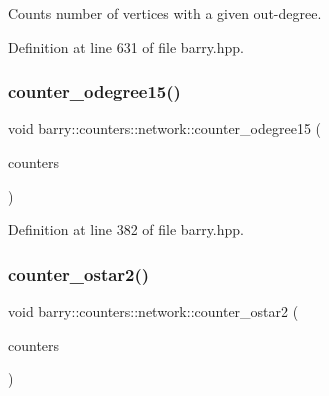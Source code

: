Counts number of vertices with a given out-\/degree. 



Definition at line 631 of file barry.\+hpp.

\mbox{\label{namespacebarry_1_1counters_1_1network_a7a43854f3227f5f92d3ff580e99c7136}} 
\subsubsection{\texorpdfstring{counter\+\_\+odegree15()}{counter\_odegree15()}}
{\footnotesize\ttfamily void barry\+::counters\+::network\+::counter\+\_\+odegree15 (\begin{DoxyParamCaption}\item[{\hyperlink{namespacebarry_1_1counters_1_1network_a3b3c590303d47840d1967372ae495d95}{Net\+Counter\+Vector} $\ast$}]{counters }\end{DoxyParamCaption})\hspace{0.3cm}{\ttfamily [inline]}}



Definition at line 382 of file barry.\+hpp.

\mbox{\label{namespacebarry_1_1counters_1_1network_af76d9df31e55422bdffdb9e56870a46f}} 
\subsubsection{\texorpdfstring{counter\+\_\+ostar2()}{counter\_ostar2()}}
{\footnotesize\ttfamily void barry\+::counters\+::network\+::counter\+\_\+ostar2 (\begin{DoxyParamCaption}\item[{\hyperlink{namespacebarry_1_1counters_1_1network_a3b3c590303d47840d1967372ae495d95}{Net\+Counter\+Vector} $\ast$}]{counters }\end{DoxyParamCaption})\hspace{0.3cm}{\ttfamily [inline]}}



